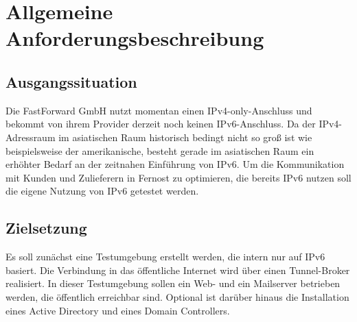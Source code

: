 \section{Allgemeine Anforderungsbeschreibung}

\subsection{Ausgangssituation}

Die FastForward GmbH nutzt momentan einen IPv4-only-Anschluss und bekommt von ihrem Provider derzeit noch keinen IPv6-Anschluss. Da der IPv4-Adressraum im asiatischen Raum historisch bedingt nicht so groß ist wie beispielsweise der amerikanische, besteht gerade im asiatischen Raum ein erhöhter Bedarf an der zeitnahen Einführung von IPv6. Um die Kommunikation mit Kunden und Zulieferern in Fernost zu optimieren, die bereits IPv6 nutzen soll die eigene Nutzung von IPv6 getestet werden.

\subsection{Zielsetzung}

Es soll zunächst eine Testumgebung erstellt werden, die intern nur auf IPv6 basiert. Die Verbindung in das öffentliche Internet wird über einen Tunnel-Broker realisiert. In dieser Testumgebung sollen ein Web- und ein Mailserver betrieben werden, die öffentlich erreichbar sind. Optional ist darüber hinaus die Installation eines Active Directory und eines Domain Controllers.